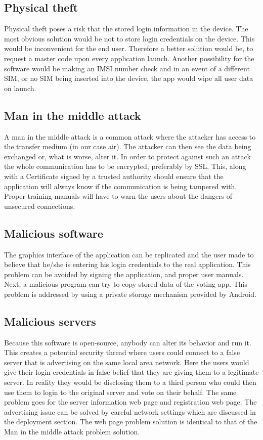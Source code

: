\documentclass[11pt,twoside,a4paper]{book}
\begin{document}
\subsection{Physical theft}
Physical theft poses a risk that the stored login information in the device. The most obvious solution would be not to store login credentials on the device. This would be inconvenient for the end user. Therefore a better solution would be, to request a master code upon every application launch. Another possibility for the software would be making an IMSI\cite{imsi} number check and in an event of a different SIM, or no SIM being inserted into the device, the app would wipe all user data on launch. 
\subsection{Man in the middle attack}
A man in the middle attack is a common attack where the attacker has access to the transfer medium (in our case air). The attacker can then see the data being exchanged or, what is worse, alter it. In order to protect against such an attack the whole communication has to be encrypted, preferably by SSL. This, along with a Certificate signed by a trusted authority should ensure that the application will always know if the communication is being tampered with. Proper training manuals will have to warn the users about the dangers of unsecured connections.
\subsection{Malicious software}
The graphics interface of the application can be replicated and the user made to believe that he/she is entering his login credentials to the real application. This problem can be avoided by signing the application, and proper user manuals.\\
Next, a malicious program can try to copy stored data of the voting app. This problem is addressed by using a private storage mechanism provided by Android. \cite{storage}
\subsection{Malicious servers}
Because this software is open-source, anybody can alter its behavior and run it. This creates a potential security thread where users could connect to a false server that is advertising on the same local area network. Here the users would give their login credentials in false belief that they are giving them to a legitimate server. In reality they would be disclosing them to a third person who could then use them to login to the original server and vote on their behalf. The same problem goes for the server information web page and registration web page. The advertising issue can be solved by careful network settings which are discussed in the deployment section. The web page problem solution is identical to that of the Man in the middle attack problem solution.
\end{document}
